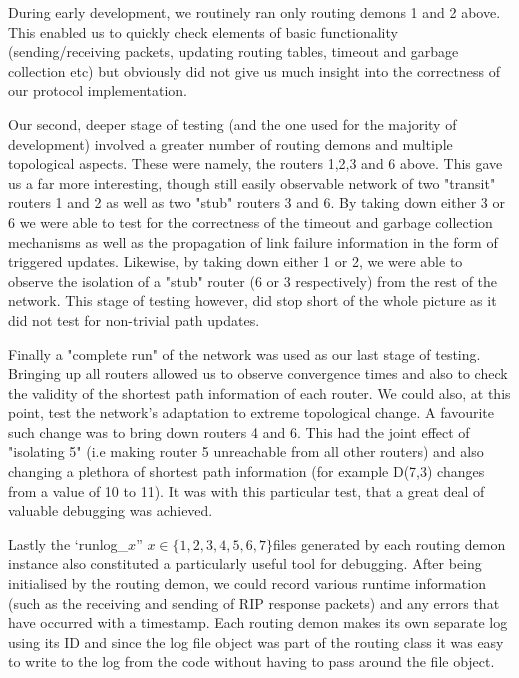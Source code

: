\documentclass[12pt,twoside]{article}
\begin{document}
During early development, we routinely ran only routing demons 1 and 2 above. This enabled us to quickly check elements of basic functionality (sending/receiving packets, updating routing tables, timeout and garbage collection etc) but obviously did not give us much insight into the correctness of our protocol implementation.

Our second, deeper stage of testing (and the one used for the majority of development) involved a greater number of routing demons and multiple topological aspects. These were namely, the routers 1,2,3 and 6 above. This gave us a far more interesting, though still easily observable network of two "transit" routers 1 and 2 as well as two "stub" routers 3 and 6. By taking down either 3 or 6 we were able to test for the correctness of the timeout and garbage collection mechanisms as well as the propagation of link failure information in the form of triggered updates. Likewise, by taking down either 1 or 2, we were able to observe the isolation of a "stub" router (6 or 3 respectively) from the rest of the network. This stage of testing however, did stop short of the whole picture as it did not test for non-trivial path updates.

Finally a "complete run" of the network was used as our last stage of testing. Bringing up all routers allowed us to observe convergence times and also to check the validity of the shortest path information of each router. We could also, at this point, test the network's adaptation to extreme topological change. A favourite such change was to bring down routers 4 and 6. This had the joint effect of "isolating 5" (i.e making router 5 unreachable from all other routers) and also changing a plethora of shortest path information (for example D(7,3) changes from a value of 10 to 11). It was with this particular test, that a great deal of valuable debugging was achieved.

Lastly the ‘runlog\_$x$” $x\in \{1,2,3,4,5,6,7\}$files generated by each routing demon instance also constituted a particularly useful tool for debugging. After being initialised by the routing demon, we could record various runtime information (such as the receiving and sending of RIP response packets) and any errors that have occurred with a timestamp. Each routing demon makes its own separate log using its ID and since the log file object was part of the routing class it was easy to write to the log from the code without having to pass around the file object. 
\end{document}

